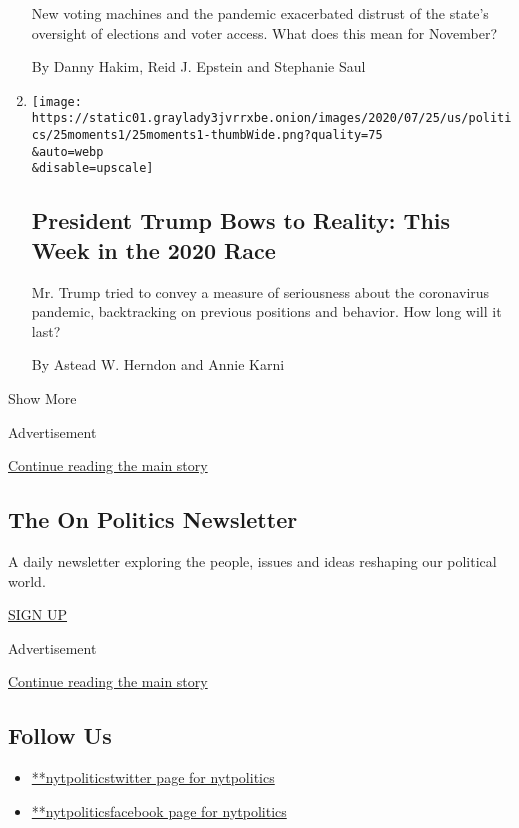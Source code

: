 \begin{enumerate}
  New voting machines and the pandemic exacerbated distrust of the
  state's oversight of elections and voter access. What does this mean
  for November?

  By Danny Hakim, Reid J. Epstein and Stephanie Saul
\item
  \href{/2020/07/25/us/politics/trump-biden-polls-coronavirus.html}{}

  \texttt{[image: https://static01.graylady3jvrrxbe.onion/images/2020/07/25/us/politics/25moments1/25moments1-thumbWide.png?quality=75\\\&auto=webp\\\&disable=upscale]}

  \hypertarget{president-trump-bows-to-reality-this-week-in-the-2020-race-1}{%
  \subsection{President Trump Bows to Reality: This Week in the 2020
  Race}\label{president-trump-bows-to-reality-this-week-in-the-2020-race-1}}

  Mr. Trump tried to convey a measure of seriousness about the
  coronavirus pandemic, backtracking on previous positions and behavior.
  How long will it last?

  By Astead W. Herndon and Annie Karni
\end{enumerate}

Show More

Advertisement

\protect\hyperlink{after-mid2}{Continue reading the main story}

\hypertarget{the-on-politics-newsletter}{%
\subsection{The On Politics
Newsletter}\label{the-on-politics-newsletter}}

A daily newsletter exploring the people, issues and ideas reshaping our
political world.

\href{/newsletters/signup/CN}{SIGN UP}

Advertisement

\protect\hyperlink{after-mktg}{Continue reading the main story}

\hypertarget{follow-us}{%
\subsection{Follow Us}\label{follow-us}}

\begin{itemize}
\tightlist
\item
  \href{https://twitter.com/nytpolitics}{**nytpoliticstwitter page for
  nytpolitics}
\item
  \href{https://www.facebookcorewwwi.onion/nytpolitics}{**nytpoliticsfacebook
  page for nytpolitics}
\end{itemize}

